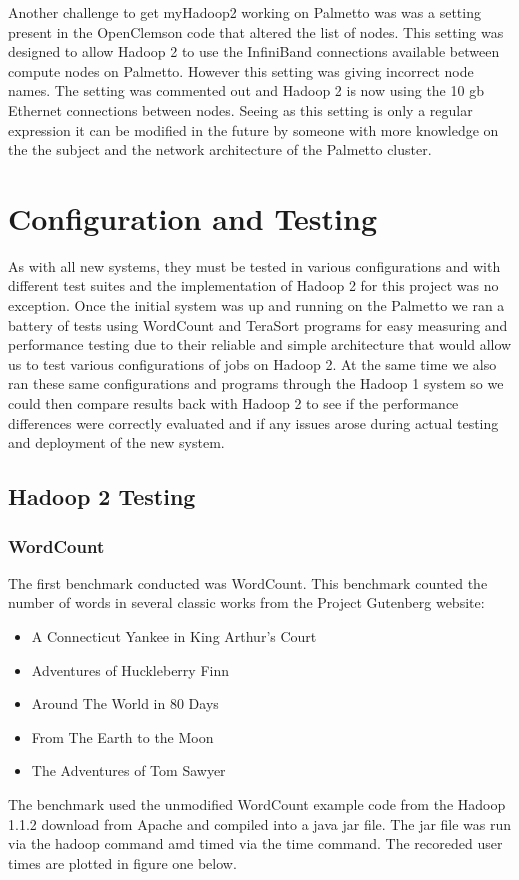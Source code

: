 \documentclass[conference]{IEEEtran}
\begin{document}
                Another challenge to get myHadoop2 working on Palmetto was was a setting present in the OpenClemson code that altered the list of nodes. This setting was designed to allow Hadoop 2 to use the InfiniBand connections available between compute nodes on Palmetto. However this setting was giving incorrect node names. The setting was commented out and Hadoop 2 is now using the 10 gb Ethernet connections between nodes. Seeing as this setting is only a regular expression it can be modified in the future by someone with more knowledge on the the subject and the network architecture of the Palmetto cluster.

		\section{Configuration and Testing}
			As with all new systems, they must be tested in various configurations and with different test suites and the implementation of Hadoop 2 for this project was no exception. Once the initial system was up and running on the Palmetto we ran a battery of tests using WordCount and TeraSort programs for easy measuring and performance testing due to their reliable and simple architecture that would allow us to test various configurations of jobs on Hadoop 2. At the same time we also ran these same configurations and programs through the Hadoop 1 system so we could then compare results back with Hadoop 2 to see if the performance differences were correctly evaluated and if any issues arose during actual testing and deployment of the new system.
			\subsection{Hadoop 2 Testing}
               \subsubsection{WordCount}
                    The first benchmark conducted was WordCount. This benchmark counted the number of words in several classic works from the Project Gutenberg website\cite{gutenburg}:
                    \begin{itemize}
                        \item A Connecticut Yankee in King Arthur's Court\cite{yankee}
                        \item Adventures of Huckleberry Finn\cite{huck}
                        \item Around The World in 80 Days\cite{80days}
                      \item From The Earth to the Moon\cite{moon}
                     \item The Adventures of Tom Sawyer\cite{tom}
                  \end{itemize}
		The benchmark used the unmodified WordCount example code from the Hadoop 1.1.2 download from Apache and compiled into a java jar file. The jar file was run via the hadoop command amd timed via the time command. The recoreded user times are plotted in figure one below.
		
\end{document}
